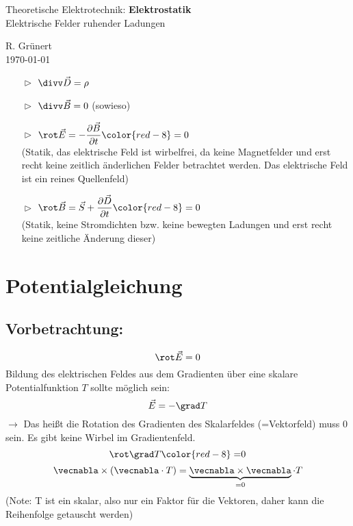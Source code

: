 \documentclass[11pt, a4paper]{article}
\begin{document}
\begin{center}
  \Large{Theoretische Elektrotechnik: \textbf{Elektrostatik}}\\
  \small{Elektrische Felder ruhender Ladungen}
\end{center}

\begin{flushright}
  R. Grünert\\
  \today
\end{flushright}

\begin{itemize}
  \item[$\vartriangleright$]$\divv \vec{D} = \rho$
  \item[$\vartriangleright$]$\divv \vec{B} = 0$ (sowieso)
  \item[$\vartriangleright$]$\rot \vec{E} = -\dfrac{\partial \vec{B}}{\partial t} \color{red-8}= 0 $ \\(Statik, das elektrische Feld ist wirbelfrei, da keine Magnetfelder und erst recht keine zeitlich änderlichen Felder betrachtet werden. Das elektrische Feld ist ein reines Quellenfeld)
  \item[$\vartriangleright$] $\rot \vec{B} = \vec{S} + \dfrac{\partial \vec{D}}{\partial t} \color{red-8}=0$\\
  (Statik, keine Stromdichten bzw. keine bewegten Ladungen und erst recht keine zeitliche Änderung dieser)
\end{itemize}

\section{Potentialgleichung}
\subsection{Vorbetrachtung:}
\[\rot \vec{E} = 0\]
Bildung des elektrischen Feldes aus dem Gradienten über eine skalare Potentialfunktion $T$ sollte möglich sein:
\[\vec{E} = -\grad T\]
$\rightarrow$ Das heißt die Rotation des Gradienten des Skalarfeldes (=Vektorfeld) muss 0 sein. Es gibt keine Wirbel im Gradientenfeld.
\[\rot \grad T {\color{red-8}=} 0\]
\[\vecnabla \times (\vecnabla \cdot T) = \underbrace{\vecnabla \times \vecnabla}_{=0}\cdot T\]
(Note: T ist ein skalar, also nur ein Faktor für die Vektoren, daher kann die Reihenfolge getauscht werden)\\
\end{document}
